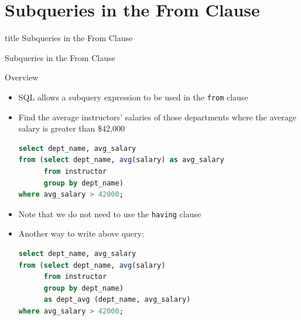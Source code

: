 \documentclass[aspectratio=169, xcolor=dvipsnames]{beamer}
\begin{document}
\section{Subqueries in the From Clause}

\begin{frame}
  \vfill
  \centering
  \begin{beamercolorbox}[sep=8pt,center,shadow=true,rounded=true]{title}
    Subqueries in the From Clause\par%
  \end{beamercolorbox}
  \vfill
\end{frame}

\begin{frame}[fragile]{Subqueries in the From Clause}
    \begin{block}{Overview}
        \begin{itemize}[<+->]
            \item SQL allows a subquery expression to be used in the \texttt{from} clause
            \item Find the average instructors' salaries of those departments where the average salary is greater than \$42,000
            \begin{lstlisting}[language=SQL, basicstyle=\ttfamily\scriptsize]
select dept_name, avg_salary 
from (select dept_name, avg(salary) as avg_salary 
      from instructor 
      group by dept_name) 
where avg_salary > 42000;
            \end{lstlisting}
            \item Note that we do not need to use the \texttt{having} clause
            \item Another way to write above query:
            \begin{lstlisting}[language=SQL, basicstyle=\ttfamily\scriptsize]
select dept_name, avg_salary 
from (select dept_name, avg(salary) 
      from instructor 
      group by dept_name) 
      as dept_avg (dept_name, avg_salary) 
where avg_salary > 42000;
            \end{lstlisting}
        \end{itemize}
    \end{block}
\end{frame}
\end{document}
